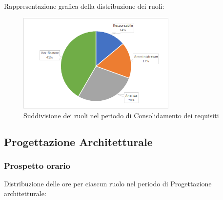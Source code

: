 		Rappresentazione grafica della distribuzione dei ruoli:
		\begin{figure}[h]
			\centering
			\includegraphics[width=0.7\textwidth]{./res/img/consolidamentoRequisiti_pe.png}
			\caption{Suddivisione dei ruoli nel periodo di Consolidamento dei requisiti}
		\end{figure}

\newpage
\subsection{Progettazione Architetturale}
	\subsubsection{Prospetto orario}
		Distribuzione delle ore per ciascun ruolo nel periodo di Progettazione architetturale:

